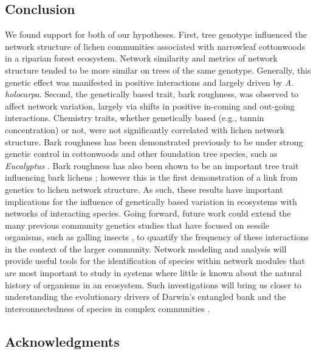 \documentclass[fleqn,12pt]{olplainarticle}
\begin{document}
\subsection*{Conclusion}

We found support for both of our hypotheses. First, tree genotype
influenced the network structure of lichen communities associated with
narrowleaf cottonwoods in a riparian forest ecosystem. Network
similarity and metrics of network structure tended to be more similar
on trees of the same genotype. Generally, this genetic effect was
manifested in positive interactions and largely driven by
\textit{A. holocarpa}. Second, the genetically based trait, bark
roughness, was observed to affect network variation, largely via
shifts in positive in-coming and out-going interactions. Chemistry
traits, whether genetically based (e.g., tannin concentration) or not,
were not significantly correlated with lichen network structure. Bark
roughness has been demonstrated previously to be under strong genetic
control in cottonwoods \citep{Bdeir2017} and other foundation tree
species, such as \textit{Eucalyptus} \citep{Nantongo2020}. Bark
roughness has also been shown to be an important tree trait
influencing bark lichens \citep{Lamit2015a}; however this is the first
demonstration of a link from genetics to lichen network structure.  As
such, these results have important implications for the influence of
genetically based variation in ecosystems with networks of interacting
species. Going forward, future work could extend the many previous
community genetics studies that have focused on sessile organisms,
such as galling insects \citep{Bailey2005ImportanceInteractions,
  Whitham2006a, Crutsinger2014, Smith2011, Keith2017}, to quantify the
frequency of these interactions in the context of the larger
community. Network modeling and analysis will provide useful tools for
the identification of species within network modules that are most
important to study in systems where little is known about the natural
history of organisms in an ecosystem.  Such investigations
will bring us closer to understanding the evolutionary drivers of
Darwin's entangled bank and the interconnectedness of species in
complex communities \citep{Darwin1859, Dattilo2016fix}.



\subsection*{Acknowledgments}
\end{document}
